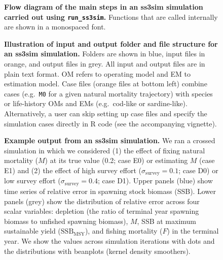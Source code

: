 \documentclass[10pt]{article}
\begin{document}
\begin{figure}[!ht]
 \begin{center}
 \end{center}
\caption{
{\bf Flow diagram of the main steps in an ss3sim simulation carried out using
  \texttt{run\_ss3sim}.} Functions that are called internally are shown in a
monospaced font.
}
\label{fig:sim-steps}
\end{figure}


\begin{figure}[!ht]
 \begin{center}
 \end{center}
\caption{
{\bf Illustration of input and output folder and file structure for an ss3sim
  simulation.} Folders are shown in blue, input files in orange, and output
files in grey. All input and output files are in plain text format. OM refers
to operating model and EM to estimation model. Case files (orange files at
bottom left) combine cases (e.g.~\texttt{M0} for a given natural mortality
trajectory) with species or life-history OMs and EMs (e.g.~cod-like or
sardine-like). Alternatively, a user can skip setting up case files and specify
the simulation cases directly in \textsf{R} code (see the accompanying vignette).
}
\end{figure}


\begin{figure}[!ht]
 \begin{center}
 \end{center}
\caption{
{\bf Example output from an ss3sim simulation.} We ran a crossed simulation in
which we considered (1) the effect of fixing natural mortality ($M$) at its
true value (0.2; case E0) or estimating $M$ (case E1) and (2) the effect of
high survey effort ($\sigma_\mathrm{survey} = 0.1$; case D0) or low survey
effort ($\sigma_\mathrm{survey} = 0.4$; case D1). Upper panels (blue) show time
series of relative error in spawning stock biomass (SSB). Lower panels (grey)
show the distribution of relative error across four scalar variables: depletion
(the ratio of terminal year spawning biomass to unfished spawning biomass),
$M$, SSB at maximum sustainable yield ($\mathrm{SSB}_\mathrm{MSY}$), and
fishing mortality ($F$) in the terminal year. We show the values across
simulation iterations with dots and the distributions with beanplots (kernel
density smoothers).
}
\label{fig:results}
\end{figure}
\end{document}
